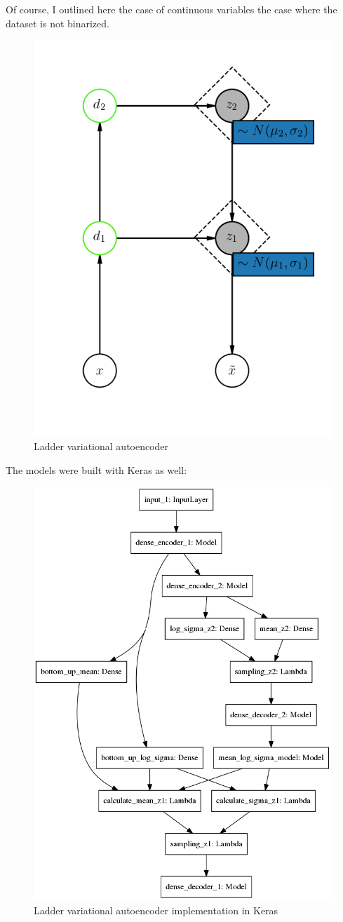 \documentclass[12pt, english]{article}
\begin{document}
\vspace{4mm}

\par Of course, I outlined here the case of continuous variables the case where the dataset is not binarized. 

\vspace{4mm}

\begin{figure}[H]
    \centering
    \includegraphics[width=0.35\linewidth]{lvae.png}
    \caption{Ladder variational autoencoder}
\end{figure}

\vspace{4mm}

\par The models were built with Keras \cite{chollet2015keras} as well:

\vspace{4mm}

\begin{figure}[H]
    \centering
    \includegraphics[width=0.6\linewidth]{dense_lvae_keras.png}
    \caption{Ladder variational autoencoder implementation in Keras}
    \label{fig:keras_lvae}
\end{figure}
\end{document}
